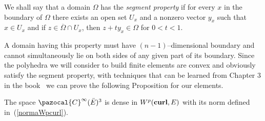 \begin{defi}
  We shall say that a domain $\Omega$ has the \textsl{segment property}
  if for every $x$ in the boundary of $\Omega$ there exists an open set
  $U_x$ and a nonzero vector $y_x$ such that $x\in U_x$ and if 
  $z\in\overline{\Omega}\cap U_x$, then $z+ty_x \in \Omega$ for $0<t<1$.
\end{defi}
A domain having this property must have $(n-1)$--dimensional boundary
and cannot simultaneously lie on both sides of any given part of its
boundary.  Since the polyhedra we will consider to build finite elements are
  convex and obviously satisfy the segment property,
  with techniques that can be learned from Chapter $3$
  in the book~\cite{adams} we can prove the following Proposition for our 
  elements.
\begin{proposition}\label{density_wpcurl}
  The space $\pazocal{C}^\infty(\bar{E})^3$ is dense in
  $W^p(\textbf{curl},{E})$ with its norm defined in~(\ref{normaWpcurl}).
\end{proposition}

